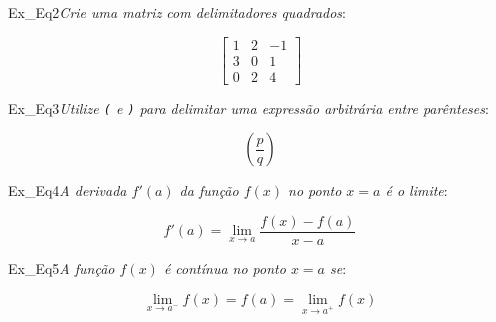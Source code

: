 \begin{texercise}{Ex_Eq2}\textit{Crie uma matriz com delimitadores quadrados}:\par\smallskip%
\begin{tcboutputlisting}
    \begin{center}
        \begin{equation*}
            \begin{bmatrix} 
                1 & 2 & -1 \\ 
                3 & 0 & 1 \\ 
                0 & 2 & 4 
            \end{bmatrix}
        \end{equation*}
    \end{center}
\end{tcboutputlisting}
\tcbuselistingtext%
\end{texercise}

\begin{texercise}{Ex_Eq3}\textit{Utilize \texttt{(} e \texttt{)} para delimitar uma expressão arbitrária entre parênteses}:\par\smallskip%
\begin{tcboutputlisting}
    \begin{center}
        \begin{equation*}
            \left( \frac{p}{q} \right)
        \end{equation*}
    \end{center}
\end{tcboutputlisting}
\tcbuselistingtext%
\end{texercise}

\begin{texercise}{Ex_Eq4}\textit{A derivada \(f'(a)\) da função \(f(x)\) no ponto \(x=a\) é o limite}:\par\smallskip%
\begin{tcboutputlisting}
    \begin{center}
        \begin{equation*}
            f'(a) = \lim_{x \to a} \frac{f(x) - f(a)}{x - a}
        \end{equation*}
    \end{center}
\end{tcboutputlisting}
\tcbuselistingtext%
\end{texercise}

\begin{texercise}{Ex_Eq5}\textit{A função \(f(x)\) é contínua no ponto \(x=a\) se}:\par\smallskip%
\begin{tcboutputlisting}
    \begin{center}
        \begin{equation*}
            \lim_{x \to a^-} f(x) = f(a) = \lim_{x \to a^+} f(x)
        \end{equation*}
    \end{center}
\end{tcboutputlisting}
\tcbuselistingtext%
\end{texercise}

